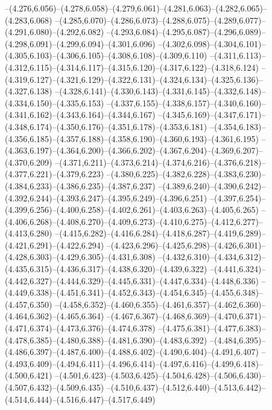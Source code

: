  --(4.276,6.056)--(4.278,6.058)--(4.279,6.061)--(4.281,6.063)--(4.282,6.065)--(4.283,6.068)%
  --(4.285,6.070)--(4.286,6.073)--(4.288,6.075)--(4.289,6.077)--(4.291,6.080)--(4.292,6.082)%
  --(4.293,6.084)--(4.295,6.087)--(4.296,6.089)--(4.298,6.091)--(4.299,6.094)--(4.301,6.096)%
  --(4.302,6.098)--(4.304,6.101)--(4.305,6.103)--(4.306,6.105)--(4.308,6.108)--(4.309,6.110)%
  --(4.311,6.113)--(4.312,6.115)--(4.314,6.117)--(4.315,6.120)--(4.317,6.122)--(4.318,6.124)%
  --(4.319,6.127)--(4.321,6.129)--(4.322,6.131)--(4.324,6.134)--(4.325,6.136)--(4.327,6.138)%
  --(4.328,6.141)--(4.330,6.143)--(4.331,6.145)--(4.332,6.148)--(4.334,6.150)--(4.335,6.153)%
  --(4.337,6.155)--(4.338,6.157)--(4.340,6.160)--(4.341,6.162)--(4.343,6.164)--(4.344,6.167)%
  --(4.345,6.169)--(4.347,6.171)--(4.348,6.174)--(4.350,6.176)--(4.351,6.178)--(4.353,6.181)%
  --(4.354,6.183)--(4.356,6.185)--(4.357,6.188)--(4.358,6.190)--(4.360,6.193)--(4.361,6.195)%
  --(4.363,6.197)--(4.364,6.200)--(4.366,6.202)--(4.367,6.204)--(4.369,6.207)--(4.370,6.209)%
  --(4.371,6.211)--(4.373,6.214)--(4.374,6.216)--(4.376,6.218)--(4.377,6.221)--(4.379,6.223)%
  --(4.380,6.225)--(4.382,6.228)--(4.383,6.230)--(4.384,6.233)--(4.386,6.235)--(4.387,6.237)%
  --(4.389,6.240)--(4.390,6.242)--(4.392,6.244)--(4.393,6.247)--(4.395,6.249)--(4.396,6.251)%
  --(4.397,6.254)--(4.399,6.256)--(4.400,6.258)--(4.402,6.261)--(4.403,6.263)--(4.405,6.265)%
  --(4.406,6.268)--(4.408,6.270)--(4.409,6.273)--(4.410,6.275)--(4.412,6.277)--(4.413,6.280)%
  --(4.415,6.282)--(4.416,6.284)--(4.418,6.287)--(4.419,6.289)--(4.421,6.291)--(4.422,6.294)%
  --(4.423,6.296)--(4.425,6.298)--(4.426,6.301)--(4.428,6.303)--(4.429,6.305)--(4.431,6.308)%
  --(4.432,6.310)--(4.434,6.312)--(4.435,6.315)--(4.436,6.317)--(4.438,6.320)--(4.439,6.322)%
  --(4.441,6.324)--(4.442,6.327)--(4.444,6.329)--(4.445,6.331)--(4.447,6.334)--(4.448,6.336)%
  --(4.449,6.338)--(4.451,6.341)--(4.452,6.343)--(4.454,6.345)--(4.455,6.348)--(4.457,6.350)%
  --(4.458,6.352)--(4.460,6.355)--(4.461,6.357)--(4.462,6.360)--(4.464,6.362)--(4.465,6.364)%
  --(4.467,6.367)--(4.468,6.369)--(4.470,6.371)--(4.471,6.374)--(4.473,6.376)--(4.474,6.378)%
  --(4.475,6.381)--(4.477,6.383)--(4.478,6.385)--(4.480,6.388)--(4.481,6.390)--(4.483,6.392)%
  --(4.484,6.395)--(4.486,6.397)--(4.487,6.400)--(4.488,6.402)--(4.490,6.404)--(4.491,6.407)%
  --(4.493,6.409)--(4.494,6.411)--(4.496,6.414)--(4.497,6.416)--(4.499,6.418)--(4.500,6.421)%
  --(4.501,6.423)--(4.503,6.425)--(4.504,6.428)--(4.506,6.430)--(4.507,6.432)--(4.509,6.435)%
  --(4.510,6.437)--(4.512,6.440)--(4.513,6.442)--(4.514,6.444)--(4.516,6.447)--(4.517,6.449)%
